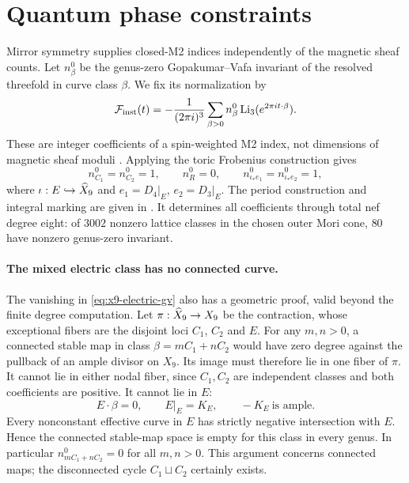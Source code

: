 \section{Quantum phase constraints}
\label{subsec:x9-mirror-periods}

Mirror symmetry supplies closed-M2 indices independently of the
magnetic sheaf counts. Let $n^0_\beta$ be the genus-zero
Gopakumar--Vafa invariant of the resolved threefold in curve class
$\beta$. We fix its normalization by
\begin{equation}
 \mathcal F_{\rm inst}(t)
 =-\frac{1}{(2\pi i)^3}\sum_{\beta>0}n^0_\beta
       \operatorname{Li}_3(e^{2\pi i t\cdot\beta}).
 \label{eq:x9-gv-prepotential}
\end{equation}
These are integer coefficients of a spin-weighted M2 index, not
dimensions of magnetic sheaf moduli
\cite{Gopakumar:1998BPS}. Applying the toric Frobenius construction
\cite{Hosono:1995Mirror,Demirtas:2024Mirror} gives
\begin{equation}
 n^0_{C_1}=n^0_{C_2}=1,\qquad n^0_R=0,\qquad
 n^0_{\iota_*e_1}=n^0_{\iota_*e_2}=1,
 \label{eq:x9-electric-gv}
\end{equation}
where $\iota:E\hookrightarrow\widehat X_9$ and
$e_1=D_4|_E$, $e_2=D_3|_E$. The period construction and integral marking are given in
\cite[Section~5 and Appendix~C]{Wuebben:2026quantum}.
It determines all coefficients through total nef degree eight:
of $3002$ nonzero lattice classes in the chosen outer Mori cone,
$80$ have nonzero genus-zero invariant.

\paragraph{The mixed electric class has no connected curve.}
The vanishing in \eqref{eq:x9-electric-gv} also has a geometric
proof, valid beyond the finite degree computation. Let
$\pi:\widehat X_9\to X_9$ be the contraction, whose exceptional fibers
are the disjoint loci $C_1$, $C_2$ and $E$. For any $m,n>0$, a
connected stable map in class $\beta=mC_1+nC_2$ would have zero
degree against the pullback of an ample divisor on $X_9$.
Its image must therefore lie in one fiber of $\pi$.
It cannot lie in either nodal fiber, since $C_1,C_2$ are independent
classes and both coefficients are positive. It cannot lie in $E$:
\begin{equation}
 E\cdot\beta=0,\qquad E|_E=K_E,
 \qquad -K_E\ \text{is ample}.
 \label{eq:x9-mixed-map-obstruction}
\end{equation}
Every nonconstant effective curve in $E$ has strictly negative
intersection with $E$. Hence the connected stable-map space is
empty for this class in every genus. In particular
$n^0_{mC_1+nC_2}=0$ for all $m,n>0$. This argument concerns
connected maps; the disconnected cycle $C_1\sqcup C_2$ certainly
exists.


